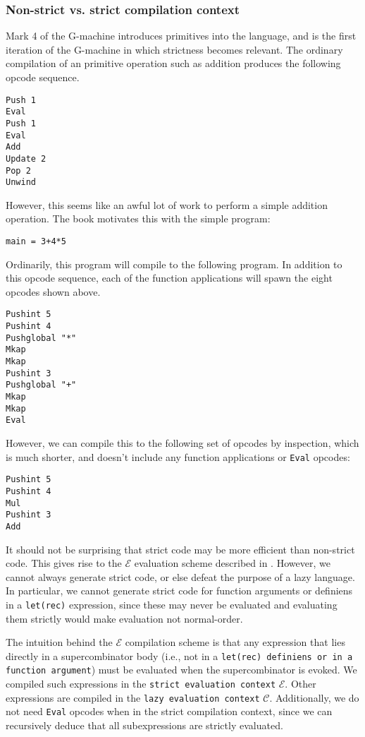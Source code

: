 \subsubsection{Non-strict vs. strict compilation context}
\label{sec:strict-context}

Mark 4 of the G-machine introduces primitives into the language, and is the first iteration of the G-machine in which strictness becomes relevant. The ordinary compilation of an primitive operation such as addition produces the following opcode sequence.

\begin{verbatim}
Push 1
Eval
Push 1
Eval
Add
Update 2
Pop 2
Unwind
\end{verbatim}

However, this seems like an awful lot of work to perform a simple addition operation. The book motivates this with the simple program:

\begin{verbatim}
main = 3+4*5
\end{verbatim}

Ordinarily, this program will compile to the following program. In addition to this opcode sequence, each of the function applications will spawn the eight opcodes shown above.

\begin{verbatim}
Pushint 5
Pushint 4
Pushglobal "*"
Mkap
Mkap
Pushint 3
Pushglobal "+"
Mkap
Mkap
Eval
\end{verbatim}

However, we can compile this to the following set of opcodes by inspection, which is much shorter, and doesn't include any function applications or \texttt{Eval} opcodes:

\begin{verbatim}
Pushint 5
Pushint 4
Mul
Pushint 3
Add
\end{verbatim}

It should not be surprising that strict code may be more efficient than non-strict code. This gives rise to the $\mathcal{E}$ evaluation scheme described in . However, we cannot always generate strict code, or else defeat the purpose of a lazy language. In particular, we cannot generate strict code for function arguments or definiens in a \texttt{let(rec)} expression, since these may never be evaluated and evaluating them strictly would make evaluation not normal-order.

The intuition behind the $\mathcal{E}$ compilation scheme is that any expression that lies directly in a supercombinator body (i.e., not in a \texttt{let(rec) definiens or in a function argument}) must be evaluated when the supercombinator is evoked. We compiled such expressions in the \texttt{strict evaluation context} $\mathcal{E}$. Other expressions are compiled in the \texttt{lazy evaluation context} $\mathcal{C}$. Additionally, we do not need \texttt{Eval} opcodes when in the strict compilation context, since we can recursively deduce that all subexpressions are strictly evaluated.

